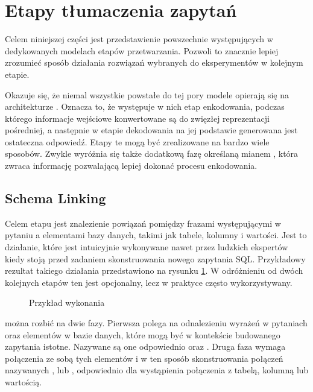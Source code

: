 \section{Etapy tłumaczenia zapytań} \label{specific-stages}
Celem niniejszej części jest przedstawienie powszechnie występujących w dedykowanych modelach  etapów przetwarzania. Pozwoli to znacznie lepiej zrozumieć sposób działania rozwiązań wybranych do eksperymentów w kolejnym etapie.

Okazuje się, że niemal wszystkie powstałe do tej pory modele opierają się na architekturze . Oznacza to, że występuje w nich etap enkodowania, podczas którego informacje wejściowe konwertowane są do zwięzłej reprezentacji pośredniej, a następnie w etapie dekodowania na jej podstawie generowana jest ostateczna odpowiedź. Etapy te mogą być zrealizowane na bardzo wiele sposobów. Zwykle wyróżnia się także dodatkową fazę określaną mianem , która zwraca informację pozwalającą lepiej dokonać procesu enkodowania. 

\subsection{Schema Linking}
Celem etapu  jest znalezienie powiązań pomiędzy frazami występującymi w pytaniu a elementami bazy danych, takimi jak tabele, kolumny i wartości. Jest to działanie, które jest intuicyjnie wykonywane nawet przez ludzkich ekspertów kiedy stoją przed zadaniem skonstruowania nowego zapytania SQL. Przykładowy rezultat takiego działania przedstawiono na rysunku \ref{fig:schema-linking}. W odróżnieniu od dwóch kolejnych etapów ten jest opcjonalny, lecz w praktyce często wykorzystywany.

\begin{figure}[ht!]
  \centering
  
  \caption{Przykład wykonania }
  \label{fig:schema-linking}
\end{figure}

 można rozbić na dwie fazy. Pierwsza polega na odnalezieniu wyrażeń w pytaniach oraz elementów w bazie danych, które mogą być w kontekście budowanego zapytania istotne. Nazywane są one odpowiednio  oraz . Druga faza  wymaga połączenia ze sobą tych elementów i w ten sposób skonstruowania połączeń nazywanych ,  lub , odpowiednio dla wystąpienia połączenia z tabelą, kolumną lub wartością.


